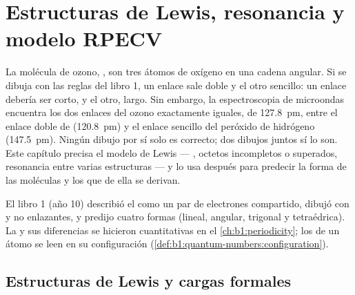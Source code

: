 \chapter{Estructuras de Lewis, resonancia y modelo RPECV}\label{ch:b1:lewis-resonance-vsepr}

La molécula de ozono, , son tres átomos de oxígeno en una cadena
angular. Si se dibuja con las reglas del libro 1, un enlace sale doble y
el otro sencillo: un enlace debería ser corto, y el otro, largo. Sin
embargo, la espectroscopia de microondas encuentra los dos enlaces
 del ozono exactamente iguales, de \qty{127.8}{pm}, entre el
enlace doble de  (\qty{120.8}{pm}) y el enlace sencillo del
peróxido de hidrógeno (\qty{147.5}{pm}). Ningún dibujo por sí solo es
correcto; dos dibujos juntos sí lo son. Este capítulo precisa el modelo
de Lewis --- , octetos incompletos o superados, resonancia
entre varias estructuras --- y lo usa después para predecir la forma de
las moléculas y los  que de ella se derivan.

\begin{recall}
El libro 1 (año 10) describió el  como un par de
electrones compartido, dibujó  con  y
no enlazantes, y predijo cuatro formas (lineal, angular, trigonal y
tetraédrica). La  y sus diferencias se hicieron
cuantitativas en el \cref{ch:b1:periodicity}; los 
de un átomo se leen en su configuración
(\cref{def:b1:quantum-numbers:configuration}).
\end{recall}

\section{Estructuras de Lewis y cargas formales}

